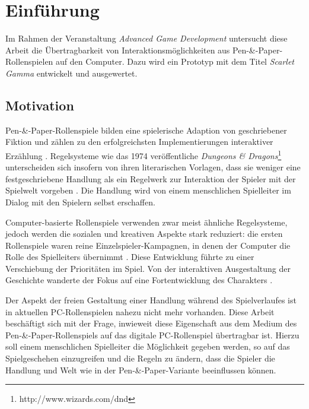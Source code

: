 \chapter{Einführung}

Im Rahmen der Veranstaltung \emph{Advanced Game Development} untersucht diese Arbeit die Übertragbarkeit von Interaktionsmöglichkeiten aus Pen-\&-Paper-Rollenspielen auf den Computer. Dazu wird ein Prototyp mit dem Titel \emph{Scarlet Gamma} entwickelt und ausgewertet.

\section{Motivation}
\label{sec:Motivation}

Pen-\&-Paper-Rollenspiele bilden eine spielerische Adaption von geschriebener Fiktion und zählen zu den erfolgreichsten Implementierungen interaktiver Erzählung \cite{Tychsen2006}. Regelsysteme wie das 1974 veröffentliche \emph{Dungeons \& Dragons}\footnote{http://www.wizards.com/dnd} unterscheiden sich insofern von ihren literarischen Vorlagen, dass sie weniger eine festgeschriebene Handlung als ein Regelwerk zur Interaktion der Spieler mit der Spielwelt vorgeben \cite{Apperley2006}. Die Handlung wird von einem menschlichen Spielleiter im Dialog mit den Spielern selbst erschaffen.

Computer-basierte Rollenspiele verwenden zwar meist ähnliche Regelsysteme, jedoch werden die sozialen und kreativen Aspekte stark reduziert: die ersten Rollenspiele waren reine Einzelspieler-Kampagnen, in denen der Computer die Rolle des Spielleiters übernimmt \cite{Apperley2006}. Diese Entwicklung führte zu einer Verschiebung der Prioritäten im Spiel. Von der interaktiven Ausgestaltung der Geschichte wanderte der Fokus auf eine Fortentwicklung des Charakters \cite{Myers2003}.

Der Aspekt der freien Gestaltung einer Handlung während des Spielverlaufes ist in aktuellen PC-Rollenspielen nahezu nicht mehr vorhanden. Diese Arbeit beschäftigt sich mit der Frage, inwieweit diese Eigenschaft aus dem Medium des Pen-\&-Paper-Rollenspiels auf das digitale PC-Rollenspiel übertragbar ist. Hierzu soll einem menschlichen Spielleiter die Möglichkeit gegeben werden, so auf das Spielgeschehen einzugreifen und die Regeln zu ändern, dass die Spieler die Handlung und Welt wie in der Pen-\&-Paper-Variante beeinflussen können.

